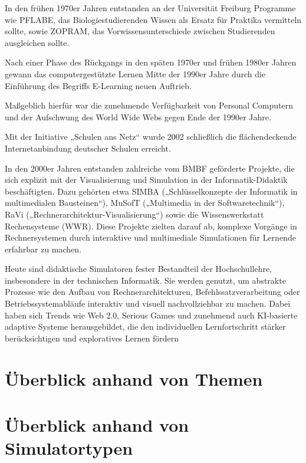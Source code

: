 In den frühen 1970er Jahren entstanden an der Universität Freiburg Programme wie PFLABE, das Biologiestudierenden Wissen als Ersatz für Praktika vermitteln sollte, sowie ZOPRAM, das Vorwissensunterschiede zwischen Studierenden ausgleichen sollte.

Nach einer Phase des Rückgangs in den späten 1970er und frühen 1980er Jahren gewann das computergestützte Lernen Mitte der 1990er Jahre durch die Einführung des Begriffs E-Learning neuen Auftrieb.

Maßgeblich hierfür war die zunehmende Verfügbarkeit von Personal Computern und der Aufschwung des World Wide Webs gegen Ende der 1990er Jahre.

 Mit der Initiative „Schulen ans Netz“ wurde 2002 schließlich die flächendeckende Internetanbindung deutscher Schulen erreicht.

In den 2000er Jahren entstanden zahlreiche vom BMBF geförderte Projekte, die sich explizit mit der Visualisierung und Simulation in der Informatik-Didaktik beschäftigten. Dazu gehörten etwa SIMBA („Schlüsselkonzepte der Informatik in multimedialen Bausteinen“), MuSofT („Multimedia in der Softwaretechnik“), RaVi („Rechnerarchitektur-Visualisierung“) sowie die Wissenswerkstatt Rechensysteme (WWR). Diese Projekte zielten darauf ab, komplexe Vorgänge in Rechnersystemen durch interaktive und multimediale Simulationen für Lernende erfahrbar zu machen.

Heute sind didaktische Simulatoren fester Bestandteil der Hochschullehre, insbesondere in der technischen Informatik. Sie werden genutzt, um abstrakte Prozesse wie den Aufbau von Rechnerarchitekturen, Befehlssatzverarbeitung oder Betriebssystemabläufe interaktiv und visuell nachvollziehbar zu machen. Dabei haben sich Trends wie Web 2.0, Serious Games und zunehmend auch KI-basierte adaptive Systeme herausgebildet, die den individuellen Lernfortschritt stärker berücksichtigen und exploratives Lernen fördern

\section{Überblick anhand von Themen}

\section{Überblick anhand von Simulatortypen}
